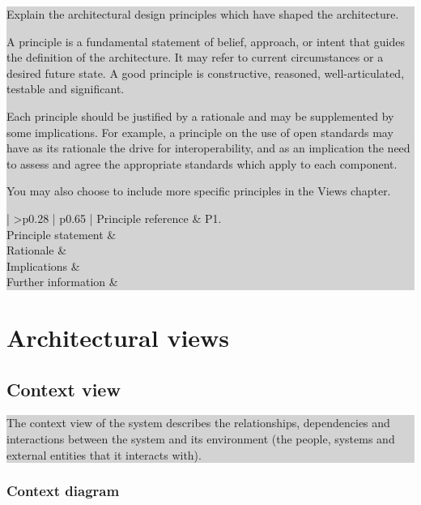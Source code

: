 \documentclass[a4paper,11pt]{report}
\newcommand{\instructions}[1]{
  \noindent\colorbox{lightgray}{%
    \parbox{\linewidth}{%
      #1
    }%
  }%
 \vspace{0.1cm}
}
\begin{document}
\instructions{
Explain the architectural design principles which have shaped the
architecture.

A principle is a fundamental statement of belief, approach, or intent
that guides the definition of the architecture. It may refer to
current circumstances or a desired future state. A good principle is
constructive, reasoned, well-articulated, testable and significant.

Each principle should be justified by a rationale and may be
supplemented by some implications. For example, a principle on the use
of open standards may have as its rationale the drive for
interoperability, and as an implication the need to assess and agree
the appropriate standards which apply to each component.

You may also choose to include more specific principles in the Views
chapter.

\begin{center}
  \begin{tabular}[h!]{| >{\columncolor{gray}}p{0.28\textwidth} | p{0.65\textwidth} |}
    \hline
    Principle reference & P1. \\
    \hline
    Principle statement & \\
    \hline
    Rationale & \\
    \hline
    Implications & \\
    \hline
    Further information & \\
    \hline
  \end{tabular}
\end{center}
}

\chapter{Architectural views}
\label{cha:architectural-views}
\thispagestyle{fancy}

\section{Context view}
\label{sec:context-view}

\instructions{
The context view of the system describes the relationships,
dependencies and interactions between the system and its environment
(the people, systems and external entities that it interacts with).
}


\subsection{Context diagram}
\label{sec:context-diagram}
\end{document}
